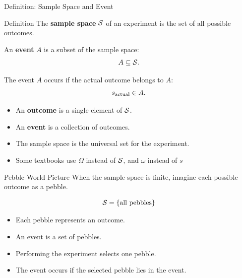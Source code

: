 \begin{frame}{Definition: Sample Space and Event}
\begin{keybox}{Definition}
The \textbf{sample space} $\mathcal{S}$ of an experiment is the set of all possible outcomes.

An \textbf{event} $A$ is a subset of the sample space:
\[
A \subseteq \mathcal{S}.
\]

The event $A$ occurs if the actual outcome belongs to $A$:
\[
s_{\mathrm{actual}} \in A.
\]
\end{keybox}

\vspace{0.25cm}

\begin{itemize}
    \item An \textbf{outcome} is a single element of $\mathcal{S}$.
    \item An \textbf{event} is a collection of outcomes.
    \item The sample space is the universal set for the experiment.
    \item Some textbooks use $\Omega$ instead of $\mathcal{S}$, and $\omega $ instead of $s$
\end{itemize}
\end{frame}

\begin{frame}{Pebble World Picture}
When the sample space is finite, imagine each possible outcome as a pebble.

\[
\mathcal{S} = \{\text{all pebbles}\}
\]

\begin{center}
\end{center}

\begin{itemize}
    \item Each pebble represents an outcome.
    \item An event is a set of pebbles.
    \item Performing the experiment selects one pebble.
    \item The event occurs if the selected pebble lies in the event.
\end{itemize}
\end{frame}

